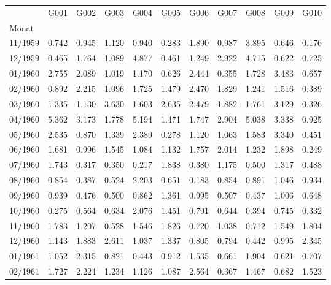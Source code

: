 \begin{tabular}{lrrrrrrrrrr}
\toprule
{} &   G001 &   G002 &   G003 &   G004 &   G005 &   G006 &   G007 &   G008 &   G009 &   G010 \\
Monat   &        &        &        &        &        &        &        &        &        &        \\
\midrule
11/1959 &  0.742 &  0.945 &  1.120 &  0.940 &  0.283 &  1.890 &  0.987 &  3.895 &  0.646 &  0.176 \\
12/1959 &  0.465 &  1.764 &  1.089 &  4.877 &  0.461 &  1.249 &  2.922 &  4.715 &  0.622 &  0.725 \\
01/1960 &  2.755 &  2.089 &  1.019 &  1.170 &  0.626 &  2.444 &  0.355 &  1.728 &  3.483 &  0.657 \\
02/1960 &  0.892 &  2.215 &  1.096 &  1.725 &  1.479 &  2.470 &  1.829 &  1.241 &  1.516 &  0.389 \\
03/1960 &  1.335 &  1.130 &  3.630 &  1.603 &  2.635 &  2.479 &  1.882 &  1.761 &  3.129 &  0.326 \\
04/1960 &  5.362 &  3.173 &  1.778 &  5.194 &  1.471 &  1.747 &  2.904 &  5.038 &  3.338 &  0.925 \\
05/1960 &  2.535 &  0.870 &  1.339 &  2.389 &  0.278 &  1.120 &  1.063 &  1.583 &  3.340 &  0.451 \\
06/1960 &  1.681 &  0.996 &  1.545 &  1.084 &  1.132 &  1.757 &  2.014 &  1.232 &  1.898 &  0.249 \\
07/1960 &  1.743 &  0.317 &  0.350 &  0.217 &  1.838 &  0.380 &  1.175 &  0.500 &  1.317 &  0.488 \\
08/1960 &  0.854 &  0.387 &  0.524 &  2.203 &  0.651 &  0.183 &  0.854 &  0.891 &  1.046 &  0.934 \\
09/1960 &  0.939 &  0.476 &  0.500 &  0.862 &  1.361 &  0.995 &  0.507 &  0.437 &  1.006 &  0.648 \\
10/1960 &  0.275 &  0.564 &  0.634 &  2.076 &  1.451 &  0.791 &  0.644 &  0.394 &  0.745 &  0.332 \\
11/1960 &  1.783 &  1.207 &  0.528 &  1.546 &  1.826 &  0.720 &  1.038 &  0.712 &  1.549 &  1.804 \\
12/1960 &  1.143 &  1.883 &  2.611 &  1.037 &  1.337 &  0.805 &  0.794 &  0.442 &  0.995 &  2.345 \\
01/1961 &  1.052 &  2.315 &  0.821 &  0.443 &  0.912 &  1.535 &  0.661 &  1.904 &  0.621 &  0.707 \\
02/1961 &  1.727 &  2.224 &  1.234 &  1.126 &  1.087 &  2.564 &  0.367 &  1.467 &  0.682 &  1.523 \\

\end{tabular}
